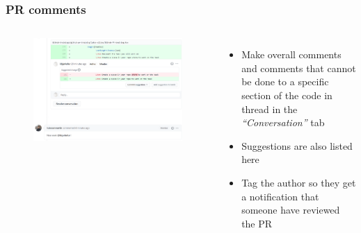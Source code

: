 \documentclass[aspectratio=169]{beamer} %
\begin{document}
\begin{frame}
	\frametitle{PR comments}
	\begin{columns}[c]
		
		\vspace{-.75cm}
		\begin{figure}
			\centering
			\includegraphics[width=\textwidth]{./img/pr-comment.png}
		\end{figure}	
		
		\begin{itemize}
			\setlength\itemsep{1em}
			\item Make overall comments and comments that cannot be done to a specific section of the code in thread in the \textit{``Conversation''} tab
			\item Suggestions are also listed here
			\item Tag the author so they get a notification that someone have reviewed the PR
		\end{itemize}
		
	\end{columns}
\end{frame}
\end{document}
